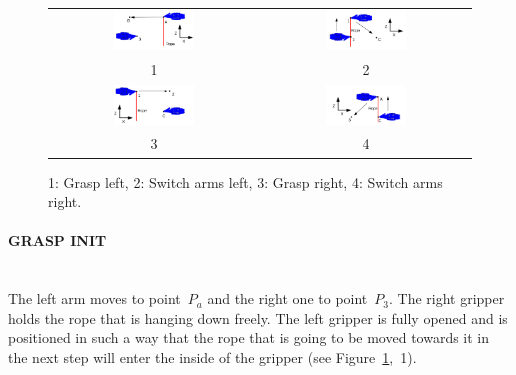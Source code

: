         \begin{figure}
            \centering
            \begin{tabular}{c|c}
            \includegraphics[width=0.4\textwidth]{GraspLeft.pdf}
            &
            \includegraphics[width=0.4\textwidth]{SwitchLeft.pdf}
            \\
            1 & 2 \\
            \hline
            \includegraphics[width=0.4\textwidth]{GraspRight.pdf}
            &
            \includegraphics[width=0.4\textwidth]{SwitchRight.pdf} \\
            3 & 4 \\

            \end{tabular}
            \caption{1: Grasp left, 2: Switch arms left, 3: Grasp right, 4: Switch arms right.}
            \label{fig:RegraspingProcedure}
        \end{figure}

        \paragraph{GRASP INIT}~\\
            The left arm moves to point~$P_a$ and the right one to point~$P_3$. The right gripper holds the rope that is hanging down freely. The left gripper is fully opened and is positioned in such a way that the rope that is going to be moved towards it in the next step will enter the inside of the gripper (see Figure~\ref{fig:RegraspingProcedure},~1).

